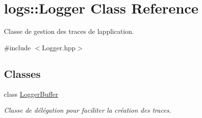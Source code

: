 \hypertarget{classlogs_1_1Logger}{}\section{logs\+:\+:Logger Class Reference}
\label{classlogs_1_1Logger}


Classe de gestion des traces de l\textquotesingle{}application.  




{\ttfamily \#include $<$Logger.\+hpp$>$}

\subsection*{Classes}
\begin{DoxyCompactItemize}
\item 
class \hyperlink{classlogs_1_1Logger_1_1LoggerBuffer}{Logger\+Buffer}
\begin{DoxyCompactList}\small\item\em Classe de délégation pour faciliter la création des traces. \end{DoxyCompactList}\end{DoxyCompactItemize}
